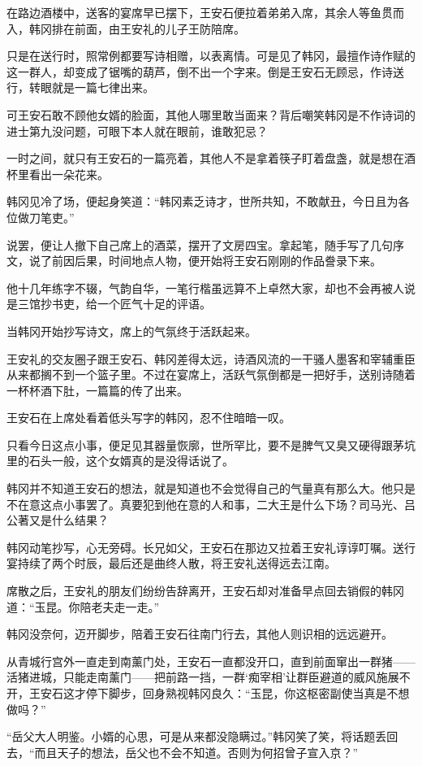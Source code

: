在路边酒楼中，送客的宴席早已摆下，王安石便拉着弟弟入席，其余人等鱼贯而入，韩冈排在前面，由王安礼的儿子王防陪席。

只是在送行时，照常例都要写诗相赠，以表离情。可是见了韩冈，最擅作诗作赋的这一群人，却变成了锯嘴的葫芦，倒不出一个字来。倒是王安石无顾忌，作诗送行，转眼就是一篇七律出来。

可王安石敢不顾他女婿的脸面，其他人哪里敢当面来？背后嘲笑韩冈是不作诗词的进士第九没问题，可眼下本人就在眼前，谁敢犯忌？

一时之间，就只有王安石的一篇亮着，其他人不是拿着筷子盯着盘盏，就是想在酒杯里看出一朵花来。

韩冈见冷了场，便起身笑道：“韩冈素乏诗才，世所共知，不敢献丑，今日且为各位做刀笔吏。”

说罢，便让人撤下自己席上的酒菜，摆开了文房四宝。拿起笔，随手写了几句序文，说了前因后果，时间地点人物，便开始将王安石刚刚的作品誊录下来。

他十几年练字不辍，气韵自华，一笔行楷虽远算不上卓然大家，却也不会再被人说是三馆抄书吏，给一个匠气十足的评语。

当韩冈开始抄写诗文，席上的气氛终于活跃起来。

王安礼的交友圈子跟王安石、韩冈差得太远，诗酒风流的一干骚人墨客和宰辅重臣从来都搁不到一个篮子里。不过在宴席上，活跃气氛倒都是一把好手，送别诗随着一杯杯酒下肚，一篇篇的传了出来。

王安石在上席处看着低头写字的韩冈，忍不住暗暗一叹。

只看今日这点小事，便足见其器量恢廓，世所罕比，要不是脾气又臭又硬得跟茅坑里的石头一般，这个女婿真的是没得话说了。

韩冈并不知道王安石的想法，就是知道也不会觉得自己的气量真有那么大。他只是不在意这点小事罢了。真要犯到他在意的人和事，二大王是什么下场？司马光、吕公著又是什么结果？

韩冈动笔抄写，心无旁碍。长兄如父，王安石在那边又拉着王安礼谆谆叮嘱。送行宴持续了两个时辰，最后还是曲终人散，将王安礼送得远去江南。

席散之后，王安礼的朋友们纷纷告辞离开，王安石却对准备早点回去销假的韩冈道：“玉昆。你陪老夫走一走。”

韩冈没奈何，迈开脚步，陪着王安石往南门行去，其他人则识相的远远避开。

从青城行宫外一直走到南薰门处，王安石一直都没开口，直到前面窜出一群猪——活猪进城，只能走南薰门——把前路一挡，一群‘痴宰相’让群臣避道的威风施展不开，王安石这才停下脚步，回身熟视韩冈良久：“玉昆，你这枢密副使当真是不想做吗？”

“岳父大人明鉴。小婿的心思，可是从来都没隐瞒过。”韩冈笑了笑，将话题丢回去，“而且天子的想法，岳父也不会不知道。否则为何招曾子宣入京？”

